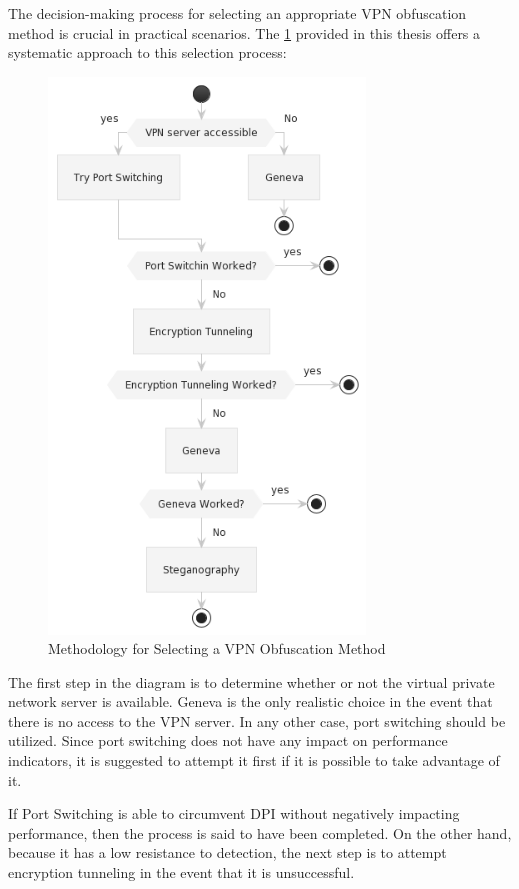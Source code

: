 \documentclass[12pt, fleqn, a4paper]{article}
\begin{document}
The decision-making process for selecting an appropriate VPN obfuscation method is crucial in practical scenarios. The \cref{fig:select} provided in this thesis offers a systematic approach to this selection process:
\begin{figure}[H]
\centering
	\includegraphics[width=0.75\textwidth]{img/selection}
\caption{Methodology for Selecting a VPN Obfuscation Method}
\label{fig:select}
\end{figure}

The first step in the diagram is to determine whether or not the virtual private network server is available. Geneva is the only realistic choice in the event that there is no access to the VPN server. In any other case, port switching should be utilized. Since port switching does not have any impact on performance indicators, it is suggested to attempt it first if it is possible to take advantage of it. 

If Port Switching is able to circumvent DPI without negatively impacting performance, then the process is said to have been completed. On the other hand, because it has a low resistance to detection, the next step is to attempt encryption tunneling in the event that it is unsuccessful.
\end{document}
